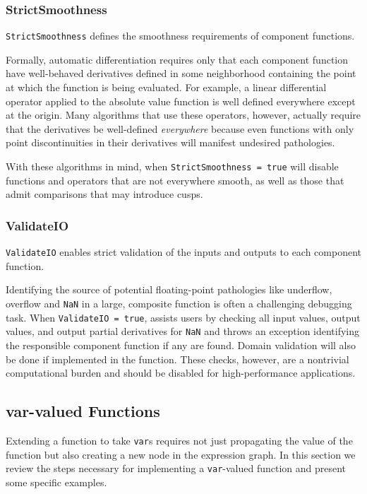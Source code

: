 \subsubsection{StrictSmoothness}

\verb|StrictSmoothness| defines the smoothness requirements of 
component functions.

Formally, automatic differentiation requires only that each component
function have well-behaved derivatives defined in some neighborhood
containing the point at which the function is being evaluated.  For
example, a linear differential operator applied to the absolute value
function is well defined everywhere except at the origin.  Many
algorithms that use these operators, however, actually require that
the derivatives be well-defined \textit{everywhere} because even 
functions with only point discontinuities in their derivatives will
manifest undesired pathologies.

With these algorithms in mind, when \verb|StrictSmoothness = true| 
\nomad will disable functions and operators that are not everywhere 
smooth, as well as those that admit comparisons that may introduce cusps.

\subsubsection{ValidateIO}

\verb|ValidateIO| enables strict validation of the inputs and outputs
to each component function.

Identifying the source of potential floating-point pathologies like
underflow, overflow and \verb|NaN| in a large, composite function
is often a challenging debugging task.  When \verb|ValidateIO = true|,
\nomad assists users by checking all input values, output values,
and output partial derivatives for \verb|NaN| and throws an
exception identifying the responsible component function if any
are found.  Domain validation will also be done if implemented in
the function.  These checks, however, are a nontrivial computational
burden and should be disabled for high-performance applications.

\subsection{var-valued Functions}

Extending a function to take \verb|var|s requires not just propagating the
value of the function but also creating a new node in the expression
graph.  In this section we review the steps necessary for implementing
a \verb|var|-valued function and present some specific examples.

